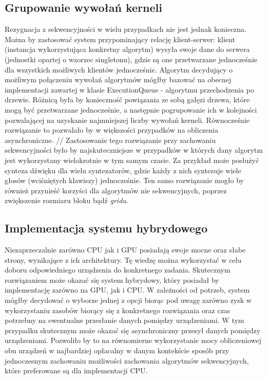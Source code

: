 \subsection{Grupowanie wywołań kerneli}
Rezygnacja z sekwencyjności w wielu przypadkach nie jest jednak konieczna. Można by zastosować system przypominający relację klient-serwer: klient (instancja wykorzystująca konkretny algorytm) wysyła swoje dane do serwera (jednostki opartej o wzorzec singleton\cite{bib:DesignPatterns}u), gdzie są one przetwarzane jednocześnie dla wszystkich możliwych klientów jednocześnie. Algorytm decydujący o możliwym połączeniu wywołań algorytmów mógłby bazować na obecnej implementacji zawartej w klasie ExecutionQueue - algorytmu przechodzenia po drzewie. Różnicą była by konieczność powiązania ze sobą gałęzi drzewa, które mogą być przetwarzane jednocześnie, a następnie pogrupowanie ich w kolejności pozwalającej na uzyskanie najmniejszej liczby wywołań kerneli. Równocześnie rozwiązanie to pozwalało by w większości przypadków na obliczenia asynchroniczne.
//
Zastosowanie tego rozwiązanie przy zachowaniu sekwencyjności było by najskuteczniejsze w przypadków w których dany algorytm jest wykorzystany wielokrotnie w tym samym czasie. Za przykład może posłużyć synteza dźwięku dla wielu syntezatorów, gdzie każdy z nich syntezuje wiele głosów (wciśniętych klawiszy) jednocześnie. Ten samo rozwiązanie mogło by również przynieść korzyści dla algorytmów nie sekwencyjnych, poprzez zwiększenie rozmiaru bloku bądź \textit{gridu}.

\subsection{Implementacja systemu hybrydowego}
Niezaprzeczalnie zarówno CPU jak i GPU posiadają swoje mocne oraz słabe strony, wynikające z ich architektury. Tę wiedzę można wykorzystać w celu doboru odpowiedniego urządzenia do konkretnego zadania. Skutecznym rozwiązaniem może okazać się system hybrydowy, który posiadał by implementację zarówno na GPU, jak i CPU. W zależności od potrzeb, system mógłby decydować o wyborze jednej z opcji biorąc pod uwagę zarówno zysk w wykorzystaniu zasobów biorący się z konkretnego rozwiązania oraz czas potrzebny na ewentualne przesłanie danych pomiędzy urządzeniami. W tym przypadku skutecznym może okazać się asynchroniczny przesył danych pomiędzy urządzeniami. Pozwoliło by to na równomierne wykorzystanie mocy obliczeniowej obu urządzeń w najbardziej opłacalny w danym kontekście sposób przy jednoczesnym zachowaniu możliwości zachowania algorytmów sekwencyjnych, które preferowane są dla implementacji CPU.

